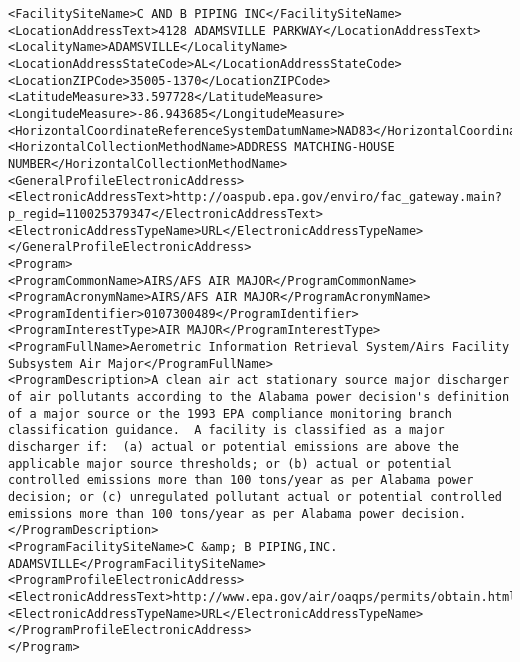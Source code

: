 \documentclass[11pt,english]{article}
\begin{document}
\begin{lstlisting}
<FacilitySiteName>C AND B PIPING INC</FacilitySiteName>
<LocationAddressText>4128 ADAMSVILLE PARKWAY</LocationAddressText>
<LocalityName>ADAMSVILLE</LocalityName>
<LocationAddressStateCode>AL</LocationAddressStateCode>
<LocationZIPCode>35005-1370</LocationZIPCode>
<LatitudeMeasure>33.597728</LatitudeMeasure>
<LongitudeMeasure>-86.943685</LongitudeMeasure>
<HorizontalCoordinateReferenceSystemDatumName>NAD83</HorizontalCoordinateReferenceSystemDatumName>
<HorizontalCollectionMethodName>ADDRESS MATCHING-HOUSE NUMBER</HorizontalCollectionMethodName>
<GeneralProfileElectronicAddress>
<ElectronicAddressText>http://oaspub.epa.gov/enviro/fac_gateway.main?p_regid=110025379347</ElectronicAddressText>
<ElectronicAddressTypeName>URL</ElectronicAddressTypeName>
</GeneralProfileElectronicAddress>
<Program>
<ProgramCommonName>AIRS/AFS AIR MAJOR</ProgramCommonName>
<ProgramAcronymName>AIRS/AFS AIR MAJOR</ProgramAcronymName>
<ProgramIdentifier>0107300489</ProgramIdentifier>
<ProgramInterestType>AIR MAJOR</ProgramInterestType>
<ProgramFullName>Aerometric Information Retrieval System/Airs Facility Subsystem Air Major</ProgramFullName>
<ProgramDescription>A clean air act stationary source major discharger of air pollutants according to the Alabama power decision's definition of a major source or the 1993 EPA compliance monitoring branch classification guidance.  A facility is classified as a major discharger if:  (a) actual or potential emissions are above the applicable major source thresholds; or (b) actual or potential controlled emissions more than 100 tons/year as per Alabama power decision; or (c) unregulated pollutant actual or potential controlled emissions more than 100 tons/year as per Alabama power decision.</ProgramDescription>
<ProgramFacilitySiteName>C &amp; B PIPING,INC. ADAMSVILLE</ProgramFacilitySiteName>
<ProgramProfileElectronicAddress>
<ElectronicAddressText>http://www.epa.gov/air/oaqps/permits/obtain.html</ElectronicAddressText>
<ElectronicAddressTypeName>URL</ElectronicAddressTypeName>
</ProgramProfileElectronicAddress>
</Program>
\end{lstlisting}
\newpage
\end{document}
